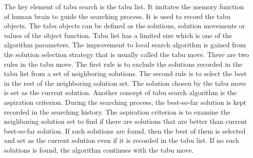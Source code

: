 		The key element of tabu search is the tabu list. It imitates the memory function of human brain to guide the searching process.
		It is used to record the tabu objects. The tabu objects can be defined as the solutions, solution movements or values of the 
		object function. Tabu list has a limited size which is one of the algorithm parameters. The improvement to local search algorithm
		is gained from the solution selection strategy that is usually called the tabu move. There are two rules in the tabu move. The
		first rule is to exclude the solutions recorded in the tabu list from a set of neighboring solutions. The second rule is to
		select the best in the rest of the neighboring solution set. The solution chosen by the tabu move is set as the current solution.
		Another concept of tabu search algorithm is the aspiration criterion. During the searching process, the best-so-far solution is
		kept recorded in the searching history. The aspiration criterion is to examine the neighboring solution set to find if there are solutions that are better than current best-so-far solution. If such solutions are found, then the best of them is selected and
		set as the current solution even if it is recorded in the tabu list. If no such solutions is found, the algorithm continues with
		the tabu move.
		
				
		
